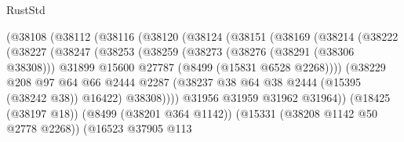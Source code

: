 \begin{lexlean}{RustStd}
\begin{coremodule}
                              (@38108
                                (@38112
                                  (@38116
                                    (@38120
                                      (@38124
                                        (@38151
                                          (@38169
                                            (@38214
                                              (@38222
                                                (@38227
                                                  (@38247
                                                    (@38253
                                                      (@38259
                                                        (@38273
                                                          (@38276 (@38291 (@38306 @38308)))
                                                          @31899
                                                          @15600
                                                          @27787
                                                          (@8499 (@15831 @6528 @2268))))
                                                      (@38229
                                                        @208
                                                        @97
                                                        @64
                                                        @66
                                                        @2444
                                                        @2287
                                                        (@38237
                                                          @38
                                                          @64
                                                          @38
                                                          @2444
                                                          (@15395 (@38242 @38))
                                                          @16422)
                                                        @38308))))
                                                @31956
                                                @31959
                                                @31962
                                                @31964))
                                            (@18425 (@38197 @18))
                                            (@8499 (@38201 @364 @1142))
                                            (@15331 (@38208 @1142 @50 @2778 @2268))
                                            (@16523
                                              @37905
                                              @113

\end{coremodule}
\end{lexlean}
